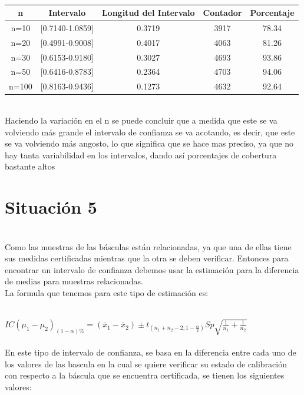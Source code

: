 \documentclass[letterpaper,12pt,onecolumn,titlepage]{article}
\begin{document}
~\\ \begin{center}
 \begin{tabular}{|c|c|c|c|c|}
\hline 
\rule[-1ex]{0pt}{2.5ex} n & Intervalo & Longitud del Intervalo & Contador & Porcentaje \\ 
\hline 
\rule[-1ex]{0pt}{2.5ex} n=10 & [0.7140-1.0859] & 0.3719 & 3917 & 78.34 \\ 
\hline 
\rule[-1ex]{0pt}{2.5ex} n=20 & [0.4991-0.9008] & 0.4017 & 4063 & 81.26 \\ 
\hline 
\rule[-1ex]{0pt}{2.5ex} n=30 & [0.6153-0.9180] & 0.3027 & 4693 & 93.86 \\ 
\hline 
\rule[-1ex]{0pt}{2.5ex} n=50 & [0.6416-0.8783] & 0.2364 & 4703 & 94.06 \\ 
\hline 
\rule[-1ex]{0pt}{2.5ex} n=100 & [0.8163-0.9436] & 0.1273 & 4632 & 92.64 \\ 
\hline 

\end{tabular} 
\end{center}


~\\ Haciendo la variaci\'{o}n en el n se puede concluir que a medida que este se va volviendo m\'{a}s grande el intervalo de confianza se va acotando, es decir, que este se va volviendo m\'{a}s angosto, lo que significa que se hace mas preciso, ya que no hay tanta variabilidad en los intervalos, dando as\'{i} porcentajes de cobertura bastante altos



\pagebreak\section{Situaci\'{o}n 5}
~\\ Como las muestras de las b\'{a}sculas est\'{a}n relacionadas, ya que una de ellas tiene sus medidas certificadas mientras que la otra se deben verificar. Entonces para encontrar un intervalo de confianza   debemos usar la estimaci\'{o}n para la diferencia de medias para muestras relacionadas.
~\\ La formula que tenemos para este tipo de estimaci\'{o}n es:

~\\ $IC(\mu_{1}-\mu_{2} )_{(1-\alpha)\%}=(\bar{x}_{1} - \bar{x}_{2}) \pm t_{(n_{1}+ n_{2} -2 ; 1-\frac{\alpha}{2})}S{p}\sqrt{\frac{1}{n_1}+\frac{1}{n_2}}$ \\


~\\ En este tipo de intervalo de confianza,  se basa en la diferencia entre cada uno de los valores de las bascula en la cual se quiere verificar su estado de calibraci\'{o}n con respecto a la b\'{a}scula que se encuentra certificada, se tienen los siguientes valores:
 
\end{document}
